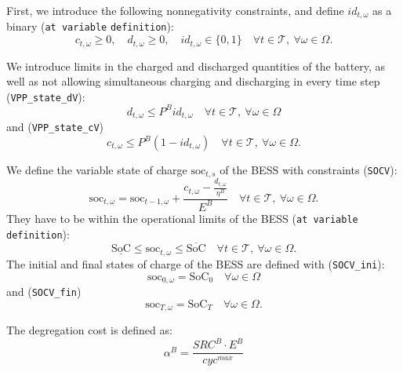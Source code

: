 \documentclass{article}
\newcommand{\SOC}{\text{SoC}}
\newcommand{\soc}{\text{soc}}
\begin{document}
First, we introduce the following nonnegativity  constraints, and define $id_{t, \omega}$ as a binary (\verb|at variable| \verb|definition|):
\begin{equation} \label{dVdCPos}
	c_{t, \omega} \geq 0, \quad d_{t, \omega} \geq 0, \quad id_{t, \omega} \in \{ 0, 1 \} \quad \forall t \in \mathcal{T}, \ \forall \omega \in \Omega.
\end{equation}

We introduce limits in the charged and discharged quantities of the battery, as well as not allowing simultaneous charging and discharging in every time step (\verb|VPP_state_dV|):
\begin{equation} \label{EQ:VPP_state_dV}
	d_{t, \omega} \leq P^B id_{t, \omega} \quad \forall t \in \mathcal{T}, \ \forall \omega \in \Omega
\end{equation}
and (\verb|VPP_state_cV|)
\begin{equation} \label{EQ:VPP_state_cV}
	c_{t, \omega} \leq P^B (1 - id_{t, \omega}) \quad \forall t \in \mathcal{T}, \ \forall \omega \in \Omega.
\end{equation}

We define the variable state of charge $\soc_{t, s}$ of the BESS with constraints (\verb|SOCV|): 
\begin{equation} \label{EQ:SOCV}
	\soc_{t, \omega} = \soc_{t - 1, \omega} + \frac{c_{t, \omega} - \frac{d_{t, \omega}}{\eta^B}}{E^B} \quad \forall t \in \mathcal{T}, \ \forall \omega \in \Omega. 
\end{equation} 
They have to be within the operational limits of the BESS (\verb|at variable definition|):
\begin{equation} \label{EQ:socVOperLimits}
	\underline{\SOC} \leq \soc_{t, \omega} \leq \overline{\SOC} \quad \forall t \in \mathcal{T}, \ \forall \omega \in \Omega.
\end{equation}
The initial and final states of charge of the BESS are defined with (\verb|SOCV_ini|):
\begin{equation} \label{EQ:SOCV_ini}
	\soc_{0, \omega} = \SOC_0 \quad \forall \omega \in \Omega
\end{equation}
and (\verb|SOCV_fin|)
\begin{equation} \label{EQ:SOCV_fin}
	\soc_{T, \omega} = \SOC_T \quad \forall \omega \in \Omega.
\end{equation}

The degregation cost is defined as:
\begin{equation} \label{EQ:BESS_DEGR}
    \alpha^B = \frac{SRC^B \cdot E^B}{cyc^{max}}
\end{equation}
\end{document}
